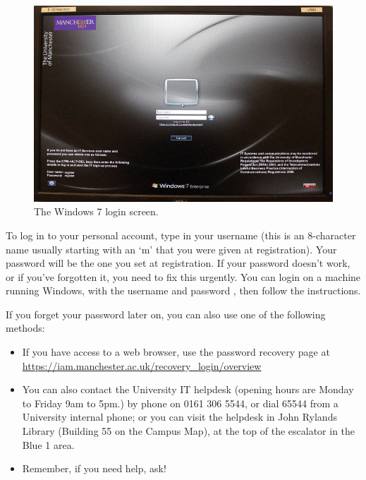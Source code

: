 \begin{figure}
\centerline{\includegraphics[width=15cm]{images/TH-win-login}}
\caption{The Windows 7 login screen.}
\label{figure:login-screen}
\end{figure}

To log in to your personal account, type in your username (this is an
8-character name usually starting with an `m' that you were given at registration). Your password will
be the one  you set at registration. If your password doesn't work, or if you've forgotten it,
you need to fix this urgently. You can login on a machine running Windows,  with the username  and password , then follow the instructions.

If you forget your password later on, you can also use one of the following methods:
\begin{itemize}
\item If you have access to a web browser, use the password recovery page at\\ \url{https://iam.manchester.ac.uk/recovery_login/overview}
\item You can also contact the University IT helpdesk (opening hours are Monday to Friday 9am to 5pm.) by phone on 0161 306 5544, or dial 65544 from a University internal phone; or you can visit the helpdesk in John Rylands Library (Building 55 on
the Campus Map), at the top of the escalator in the Blue 1 area.
\item Remember, if you need help, ask!
\end{itemize}


